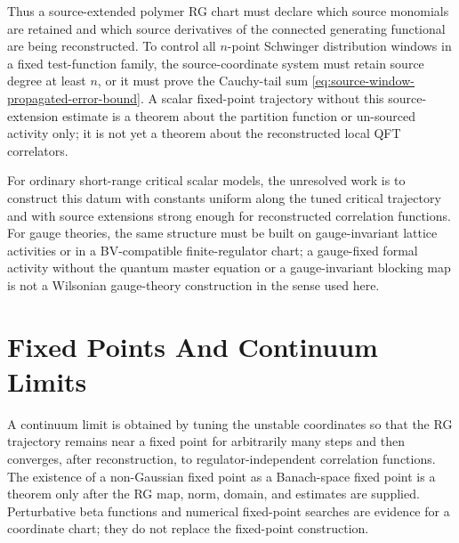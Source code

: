 Thus a source-extended polymer RG chart must declare which source monomials
are retained and which source derivatives of the connected generating
functional are being reconstructed.  To control all \(n\)-point Schwinger
distribution windows in a fixed test-function family, the source-coordinate system must
retain source degree at least \(n\), or it must prove the Cauchy-tail sum
\eqref{eq:source-window-propagated-error-bound}.  A scalar fixed-point
trajectory without this source-extension estimate is a theorem about the
partition function or un-sourced activity only; it is not yet a theorem
about the reconstructed local QFT correlators.

For ordinary short-range critical scalar models, the unresolved work is to
construct this datum with constants uniform along the tuned critical
trajectory and with source extensions strong enough for reconstructed
correlation functions.  For gauge theories, the same structure must be built
on gauge-invariant lattice activities or in a BV-compatible finite-regulator
chart; a gauge-fixed formal activity without the quantum master equation or a
gauge-invariant blocking map is not a Wilsonian gauge-theory construction in
the sense used here.

\section{Fixed Points And Continuum Limits}

A continuum limit is obtained by tuning the unstable coordinates so that the
RG trajectory remains near a fixed point for arbitrarily many steps and then
converges, after reconstruction, to regulator-independent correlation
functions.  The existence of a non-Gaussian fixed point as a Banach-space
fixed point is a theorem only after the RG map, norm, domain, and estimates
are supplied.  Perturbative beta functions and numerical fixed-point searches
are evidence for a coordinate chart; they do not replace the fixed-point
construction.

